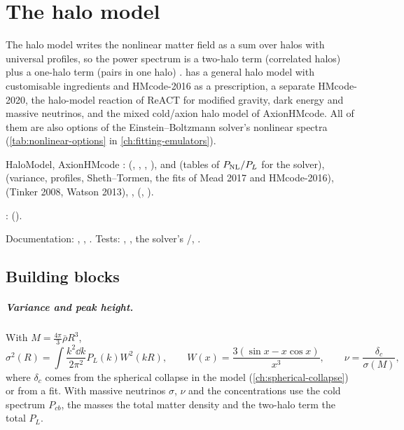 \chapter{The halo model}\label{ch:halo-model}

The halo model writes the nonlinear matter field as a sum over halos with universal profiles, so the power spectrum is a
two-halo term (correlated halos) plus a one-halo term (pairs in one halo) \cite{CooraySheth2002}. \fml{} has a general
halo model with customisable ingredients and HMcode-2016 as a prescription, a separate HMcode-2020, the halo-model
reaction of ReACT for modified gravity, dark energy and massive neutrinos, and the mixed cold/axion halo model of
AxionHMcode. All of them are also options of the Einstein--Boltzmann solver's nonlinear spectra (\cref{tab:nonlinear-options}
in \cref{ch:fitting-emulators}).

\begin{modulebox}{HaloModel, AxionHMcode}
:  (, , ,
),  and  (tables of $P_{\rm NL}/P_L$ for the solver),
 (variance, profiles, Sheth--Tormen, the fits of Mead 2017 and HMcode-2016),
 (Tinker 2008, Watson 2013), , 
(, ).\par
{}:  ().\par
Documentation: , , .
Tests: , , the solver's
/, .
\end{modulebox}

\section{Building blocks}\label{sec:hm-blocks}

\paragraph*{Variance and peak height.} With $M=\frac{4\pi}3\bar\rho R^3$,
\begin{equation}
\sigma^2(R)=\int\frac{k^2\dd k}{2\pi^2}P_L(k)W^2(kR),\qquad W(x)=\frac{3(\sin x-x\cos x)}{x^3},\qquad\nu=\frac{\delta_c}{\sigma(M)},
\end{equation}
where $\delta_c$ comes from the spherical collapse in the model (\cref{ch:spherical-collapse}) or from a fit. With massive
neutrinos $\sigma$, $\nu$ and the concentrations use the cold spectrum $P_{cb}$, the masses the total matter density and
the two-halo term the total $P_L$.

